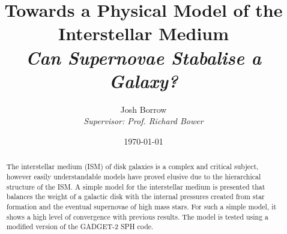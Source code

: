 
\begin{titlepage}

\thispagestyle{empty}

\author{Josh Borrow\\
\emph{Supervisor: Prof. Richard Bower}}
\date{\today}
    \title{Towards a Physical Model of the Interstellar Medium\\
\vspace{4mm}
\large \emph{Can Supernovae Stabalise a Galaxy?}}
\maketitle

\vspace{10mm}
\begin{abstract}
The interstellar medium (ISM) of disk galaxies is a complex and critical subject, however easily understandable models have proved elusive due to the hierarchical structure of the ISM. A simple model for the interstellar medium is presented that balances the weight of a galactic disk with the internal pressures created from star formation and the eventual supernovae of high mass stars. For such a simple model, it shows a high level of convergence with previous results. The model is tested using a modified version of the GADGET-2 SPH code.
\end{abstract}

\end{titlepage}

\newpage

